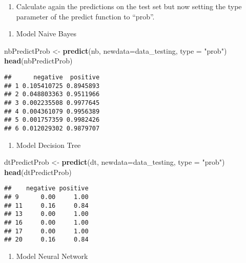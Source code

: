 \documentclass[]{article}
\newenvironment{Shaded}{\begin{snugshade}}{\end{snugshade}}
\newcommand{\DataTypeTok}[1]{\textcolor[rgb]{0.13,0.29,0.53}{#1}}
\newcommand{\KeywordTok}[1]{\textcolor[rgb]{0.13,0.29,0.53}{\textbf{#1}}}
\newcommand{\NormalTok}[1]{#1}
\newcommand{\StringTok}[1]{\textcolor[rgb]{0.31,0.60,0.02}{#1}}
\providecommand{\tightlist}{%
  \setlength{\itemsep}{0pt}\setlength{\parskip}{0pt}}
\begin{document}
\begin{enumerate}
\def\labelenumi{\alph{enumi})}
\tightlist
\item
  Calculate again the predictions on the test set but now setting the
  type parameter of the predict function to ``prob''.
\end{enumerate}

\begin{enumerate}
\def\labelenumi{\arabic{enumi}.}
\tightlist
\item
  Model Naive Bayes
\end{enumerate}

\begin{Shaded}
\begin{Highlighting}[]
\NormalTok{nbPredictProb <-}\StringTok{ }\KeywordTok{predict}\NormalTok{(nb, }\DataTypeTok{newdata=}\NormalTok{data_testing, }\DataTypeTok{type =} \StringTok{"prob"}\NormalTok{)}
\KeywordTok{head}\NormalTok{(nbPredictProb)}
\end{Highlighting}
\end{Shaded}

\begin{verbatim}
##      negative  positive
## 1 0.105410725 0.8945893
## 2 0.048803363 0.9511966
## 3 0.002235508 0.9977645
## 4 0.004361079 0.9956389
## 5 0.001757359 0.9982426
## 6 0.012029302 0.9879707
\end{verbatim}

\begin{enumerate}
\def\labelenumi{\arabic{enumi}.}
\setcounter{enumi}{1}
\tightlist
\item
  Model Decision Tree
\end{enumerate}

\begin{Shaded}
\begin{Highlighting}[]
\NormalTok{dtPredictProb <-}\StringTok{ }\KeywordTok{predict}\NormalTok{(dt, }\DataTypeTok{newdata=}\NormalTok{data_testing, }\DataTypeTok{type =} \StringTok{"prob"}\NormalTok{)}
\KeywordTok{head}\NormalTok{(dtPredictProb)}
\end{Highlighting}
\end{Shaded}

\begin{verbatim}
##    negative positive
## 9      0.00     1.00
## 11     0.16     0.84
## 13     0.00     1.00
## 16     0.00     1.00
## 17     0.00     1.00
## 20     0.16     0.84
\end{verbatim}

\begin{enumerate}
\def\labelenumi{\arabic{enumi}.}
\setcounter{enumi}{2}
\tightlist
\item
  Model Neural Network
\end{enumerate}
\end{document}
